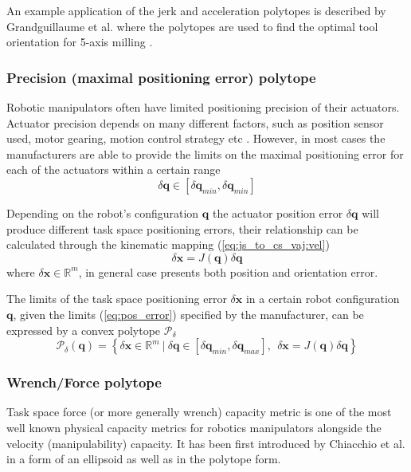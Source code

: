 An example application of the jerk and acceleration polytopes is described by Grandguillaume et al. where the polytopes are used to find the optimal tool orientation for 5-axis milling \cite{Grandguillaume2021}.

\subsubsection{Precision (maximal positioning error) polytope }

Robotic manipulators often have limited positioning precision of their actuators. Actuator precision depends on many different factors, such as position sensor used, motor gearing, motion control strategy etc \cite{pholsiri2005real,Finotello1998}. However, in most cases the manufacturers are able to provide the limits on the maximal positioning error for each of the actuators within a certain range
\begin{equation}
    \delta\bm{q} \in [\delta\bm{q}_{min}, \delta\bm{q}_{min}]
    \label{eq:pos_error}
\end{equation}

Depending on the robot's configuration $\bm{q}$ the actuator position error $\delta\bm{q}$ will produce different task space positioning errors, their relationship can be calculated through the kinematic mapping (\ref{eq:js_to_cs_vaj:vel})
\begin{equation}
    \delta\bm{x} = J(\bm{q})\delta \bm{q}
\end{equation}
where $\delta\bm{x}\in\mathbb{R}^m$, in general case presents both position and orientation error.

The limits of the task space positioning error $\delta \bm{x}$ in a certain robot configuration $\bm{q}$, given the limits (\ref{eq:pos_error}) specified by the manufacturer, can be expressed by a convex polytope $\mathcal{P}_\delta$
\begin{equation}
    \mathcal{P}_\delta(\bm{q}) = \left\{ \delta \bm{x} \in \mathbb{R}^m ~|~ \delta  {\bm{q}}\in\left[ \delta {\bm{q}}_{min}, \delta {\bm{q}}_{max} \right], ~~  \delta  {\bm{x}} = J(\bm{q}) \delta {\bm{q}} \right\}
    \label{eq:poly_precision_rob}
\end{equation}

\subsubsection{Wrench/Force polytope}
\label{ch:poly_force}
Task space force (or more generally wrench) capacity metric is one of the most well known physical capacity metrics for robotics manipulators alongside the velocity (manipulability) capacity. It has been first introduced by Chiacchio et al. \cite{chiacchio_evaluation_1996} in a form of an ellipsoid as well as in the polytope form.

